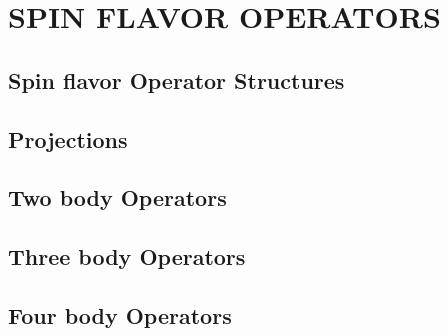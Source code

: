 \chapter{SPIN FLAVOR OPERATORS}

\section{Spin flavor Operator Structures}
\section{Projections}
\section{Two body Operators}
\section{Three body Operators}
\section{Four body Operators}

\newpage
